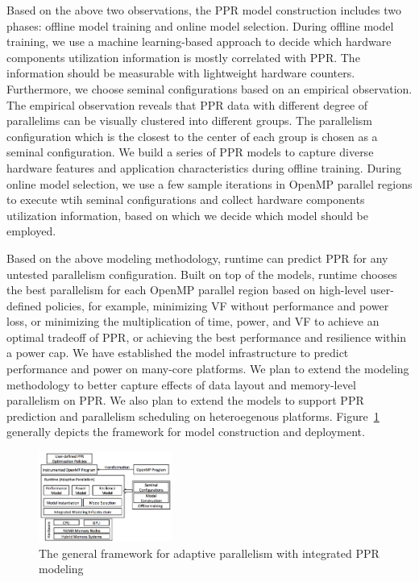 \documentclass{article}  %
\begin{document}
Based on the above two observations, the PPR model construction 
includes two phases: offline model training and online model selection.
During offline model training, we use a machine learning-based approach
to decide which hardware components utilization information is
mostly correlated with PPR. 
The information should be measurable with lightweight hardware counters.
Furthermore, we choose seminal configurations based on an empirical observation.
The empirical observation reveals that PPR data with different degree of parallelims
can be visually clustered into different groups. The parallelism configuration
which is the closest to the center of each group is chosen as a 
seminal configuration. We build a series of PPR models to
capture diverse hardware features and application characteristics during offline training.
During online model selection, we use a few sample iterations in OpenMP parallel regions to execute
wtih seminal configurations and collect hardware components utilization
information, based on which we decide which model should be employed.

Based on the above modeling methodology, runtime can predict PPR for any untested 
parallelism configuration. Built on top of the models,
runtime chooses the best parallelism for each OpenMP parallel region based 
on high-level user-defined policies, for example, minimizing VF without performance and power
loss, or minimizing the multiplication of time, power, and VF to achieve
an optimal tradeoff of PPR, or achieving the best performance and resilience within a power cap.
We have established the model infrastructure to predict performance and power on many-core platforms.
We plan to extend the modeling methodology to better capture effects of
data layout and memory-level parallelism on PPR.
We also plan to extend the models to support PPR prediction 
and parallelism scheduling on
heteroegenous platforms. 
Figure~\ref{fig:general_framework} generally depicts the framework
for model construction and deployment.

\begin{figure}
\begin{center}
\includegraphics[width=0.39\textwidth]{figures/general_framework.png}
\end{center}
\caption{The general framework for adaptive parallelism with integrated PPR modeling}
\label{fig:general_framework}
\end{figure}
\end{document}

